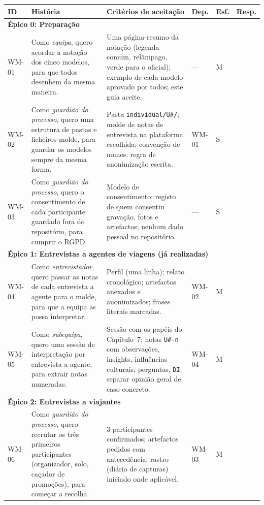 \documentclass[11pt,a4paper]{article}
\begin{document}
\begin{landscape}
{\small
\begin{longtable}{@{}p{1.2cm}p{7.0cm}p{9.2cm}p{1.2cm}p{0.9cm}p{1.8cm}@{}}
\toprule
\textbf{ID} & \textbf{História} & \textbf{Critérios de aceitação} & \textbf{Dep.} & \textbf{Esf.} & \textbf{Resp.} \\
\midrule
\endhead
\multicolumn{6}{l}{\textbf{Épico 0: Preparação}}\\
WM-01 & Como \emph{equipa}, quero acordar a notação dos cinco modelos, para que todos desenhem da mesma maneira. & Uma página-resumo da notação (legenda comum, relâmpago, verde para o oficial); exemplo de cada modelo aprovado por todos; este guia aceite. & --- & M & \\
WM-02 & Como \emph{guardião do processo}, quero uma estrutura de pastas e ficheiros-molde, para guardar os modelos sempre da mesma forma. & Pasta \texttt{individual/U\#/}; molde de notas de entrevista na plataforma escolhida; convenção de nomes; regra de anonimização escrita. & WM-01 & S & \\
WM-03 & Como \emph{guardião do processo}, quero o consentimento de cada participante guardado fora do repositório, para cumprir o RGPD. & Modelo de consentimento; registo de quem consentiu gravação, fotos e artefactos; nenhum dado pessoal no repositório. & --- & S & \\
\midrule
\multicolumn{6}{l}{\textbf{Épico 1: Entrevistas a agentes de viagens (já realizadas)}}\\
WM-04 & Como \emph{entrevistador}, quero passar as notas de cada entrevista a agente para o molde, para que a equipa as possa interpretar. & Perfil (uma linha); relato cronológico; artefactos anexados e anonimizados; frases literais marcadas. & WM-02 & M & \\
WM-05 & Como \emph{subequipa}, quero uma sessão de interpretação por entrevista a agente, para extrair notas numeradas. & Sessão com os papéis do Capítulo~7; notas \texttt{U\#-n} com observações, insights, influências culturais, perguntas, \texttt{DI}; separar opinião geral de caso concreto. & WM-04 & M & \\
\midrule
\multicolumn{6}{l}{\textbf{Épico 2: Entrevistas a viajantes}}\\
WM-06 & Como \emph{guardião do processo}, quero recrutar os três primeiros participantes (organizador, solo, caçador de promoções), para começar a recolha. & 3 participantes confirmados; artefactos pedidos com antecedência; rastro (diário de capturas) iniciado onde aplicável. & WM-03 & M & \\

\end{longtable}}
\end{landscape}
\end{document}
